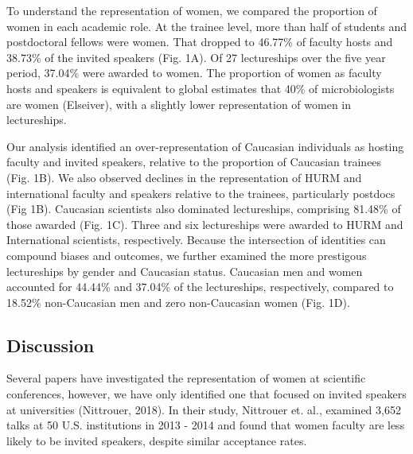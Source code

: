 \documentclass[10pt,]{article}
\begin{document}
To understand the representation of women, we compared the proportion of
women in each academic role. At the trainee level, more than half of
students and postdoctoral fellows were women. That dropped to 46.77\% of
faculty hosts and 38.73\% of the invited speakers (Fig. 1A). Of 27
lectureships over the five year period, 37.04\% were awarded to women.
The proportion of women as faculty hosts and speakers is equivalent to
global estimates that 40\% of microbiologists are women (Elseiver), with
a slightly lower representation of women in lectureships.

Our analysis identified an over-representation of Caucasian individuals
as hosting faculty and invited speakers, relative to the proportion of
Caucasian trainees (Fig. 1B). We also observed declines in the
representation of HURM and international faculty and speakers relative
to the trainees, particularly postdocs (Fig 1B). Caucasian scientists
also dominated lectureships, comprising 81.48\% of those awarded (Fig.
1C). Three and six lectureships were awarded to HURM and International
scientists, respectively. Because the intersection of identities can
compound biases and outcomes, we further examined the more prestigous
lectureships by gender and Caucasian status. Caucasian men and women
accounted for 44.44\% and 37.04\% of the lectureships, respectively,
compared to 18.52\% non-Caucasian men and zero non-Caucasian women (Fig.
1D).

\subsection{Discussion}\label{discussion}

Several papers have investigated the representation of women at
scientific conferences, however, we have only identified one that
focused on invited speakers at universities (Nittrouer, 2018). In their
study, Nittrouer et. al., examined 3,652 talks at 50 U.S. institutions
in 2013 - 2014 and found that women faculty are less likely to be
invited speakers, despite similar acceptance rates.
\end{document}
